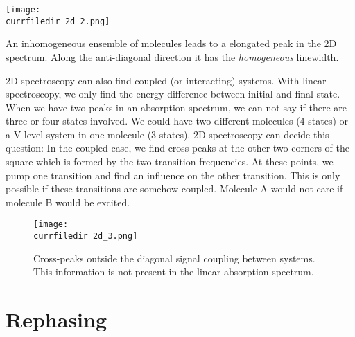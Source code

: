 \begin{marginfigure}
\texttt{[image: \\currfiledir 2d\_2.png]}
\caption{An inhomogeneous ensemble of molecules leads to a elongated peak in the 2D spectrum. Along the anti-diagonal direction it has the \emph{homogeneous} linewidth.}
\label{fig_2d_inhom}
\end{marginfigure}



2D spectroscopy can also find coupled (or interacting) systems. With linear spectroscopy, we only find the energy difference between initial and final state. When we have two peaks in an absorption spectrum, we can not say if there are three or four states involved. We could have two  different molecules (4 states) or a V level system in one molecule (3 states). 2D spectroscopy can decide this question: In the coupled case, we find cross-peaks at the  other two corners  of the square which is formed by the two transition frequencies. At these points, we pump one transition and find an influence on the other transition. This is only possible if these transitions are somehow coupled. Molecule A would not care if molecule B would be excited.

\begin{figure}
\texttt{[image: \\currfiledir 2d\_3.png]}
\caption{Cross-peaks outside the diagonal signal coupling between systems. This information is not present in the linear absorption spectrum.}
\label{fig_2d_crosspeak}
\end{figure}


\section{Rephasing}


